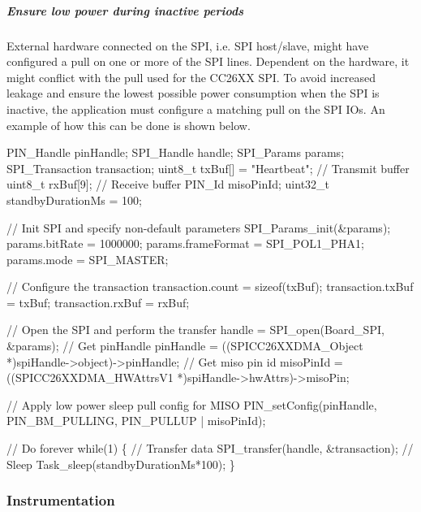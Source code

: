 \subparagraph*{Ensure low power during inactive periods\label{_s_p_i_c_c26_x_x_d_m_a_8h_USE_CASE_LPWR}%
\hypertarget{_s_p_i_c_c26_x_x_d_m_a_8h_USE_CASE_LPWR}{}%
}

External hardware connected on the S\+P\+I, i.\+e. S\+P\+I host/slave, might have configured a pull on one or more of the S\+P\+I lines. Dependent on the hardware, it might conflict with the pull used for the C\+C26\+X\+X S\+P\+I. To avoid increased leakage and ensure the lowest possible power consumption when the S\+P\+I is inactive, the application must configure a matching pull on the S\+P\+I I\+Os. An example of how this can be done is shown below.


\begin{DoxyCode}
PIN_Handle pinHandle;
SPI_Handle handle;
SPI_Params params;
SPI_Transaction transaction;
uint8\_t txBuf[] = \textcolor{stringliteral}{"Heartbeat"};    \textcolor{comment}{// Transmit buffer}
uint8\_t rxBuf[9];                 \textcolor{comment}{// Receive buffer}
PIN_Id misoPinId;
uint32\_t standbyDurationMs = 100;

\textcolor{comment}{// Init SPI and specify non-default parameters}
SPI_Params_init(&params);
params.bitRate     = 1000000;
params.frameFormat = SPI_POL1_PHA1;
params.mode        = SPI_MASTER;

\textcolor{comment}{// Configure the transaction}
transaction.count = \textcolor{keyword}{sizeof}(txBuf);
transaction.txBuf = txBuf;
transaction.rxBuf = rxBuf;

\textcolor{comment}{// Open the SPI and perform the transfer}
handle = SPI_open(Board\_SPI, &params);
\textcolor{comment}{// Get pinHandle}
pinHandle = ((SPICC26XXDMA_Object *)spiHandle->object)->pinHandle;
\textcolor{comment}{// Get miso pin id}
misoPinId = ((SPICC26XXDMA_HWAttrsV1 *)spiHandle->hwAttrs)->misoPin;

\textcolor{comment}{// Apply low power sleep pull config for MISO}
PIN_setConfig(pinHandle, PIN_BM_PULLING, PIN_PULLUP | misoPinId);

\textcolor{comment}{// Do forever}
\textcolor{keywordflow}{while}(1) \{
  \textcolor{comment}{// Transfer data}
  SPI_transfer(handle, &transaction);
  \textcolor{comment}{// Sleep}
  Task\_sleep(standbyDurationMs*100);
\}
\end{DoxyCode}


\subsubsection*{Instrumentation}

